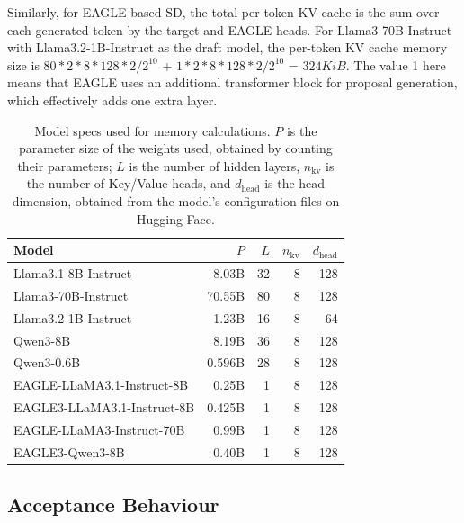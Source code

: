 \documentclass{article}
\begin{document}
Similarly, for EAGLE-based SD, the total per-token KV cache is the sum over each generated token by the target and EAGLE heads. For Llama3-70B-Instruct with Llama3.2-1B-Instruct as the draft model, the per-token KV cache memory size is $80*2*8*128*2/2^{10}$ + $1*2*8*128*2/2^{10}$ = $324KiB$. The value 1 here means that EAGLE uses an additional transformer block for proposal generation, which effectively adds one extra layer.

\begin{table}[t]
\centering
\small
\setlength{\tabcolsep}{4pt}
\begin{tabular}{l|rrrr}
\toprule
Model & $P$ & $L$ & $n_\text{kv}$ & $d_\text{head}$ \\
\midrule
Llama3.1-8B-Instruct  & 8.03B & 32 & 8 & 128 \\
Llama3-70B-Instruct   & 70.55B & 80 & 8 & 128 \\
Llama3.2-1B-Instruct  & 1.23B & 16 & 8 & 64 \\
Qwen3-8B              & 8.19B & 36 & 8 & 128 \\
Qwen3-0.6B              & 0.596B & 28 & 8 & 128 \\
EAGLE-LLaMA3.1-Instruct-8B & 0.25B & 1 & 8 & 128 \\
EAGLE3-LLaMA3.1-Instruct-8B & 0.425B & 1 & 8 & 128 \\
EAGLE-LLaMA3-Instruct-70B & 0.99B & 1 & 8 & 128 \\
EAGLE3-Qwen3-8B            &  0.40B     & 1 & 8 & 128 \\
\bottomrule
\end{tabular}
\vspace{2pt}
\caption{Model specs used for memory calculations. $P$ is the parameter size of the weights used, obtained by counting their parameters; $L$ is the number of hidden layers, $n_\text{kv}$ is the number of Key/Value heads, and $d_\text{head}$ is the head dimension, obtained from the model's configuration files on Hugging Face.}
\label{tab:mem_model_specs}
\vspace{-0.10in}
\end{table}


\subsection{Acceptance Behaviour}
\label{appendix:acc-behaviour}
\end{document}
